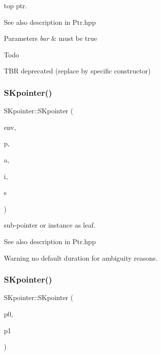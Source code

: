 top ptr. 

\begin{DoxySeeAlso}{See also}
description in Ptr.\+hpp 
\end{DoxySeeAlso}

\begin{DoxyParams}{Parameters}
{\em bar} & must be true \\
\hline
\end{DoxyParams}
\begin{DoxyRefDesc}{Todo}
\item[\mbox{\hyperlink{todo__todo000033}{Todo}}]T\+BR deprecated (replace by specific constructor) \end{DoxyRefDesc}
\mbox{\label{group__table_gac3044b001a0035c0ea79ffac0a57d1d9}} 
\subsubsection{\texorpdfstring{SKpointer()}{SKpointer()}\hspace{0.1cm}{\footnotesize\ttfamily [2/4]}}
{\footnotesize\ttfamily S\+Kpointer\+::\+S\+Kpointer (\begin{DoxyParamCaption}\item[{\mbox{\hyperlink{classEnvironment}{Environment}} $\ast$}]{env,  }\item[{const \mbox{\hyperlink{classSKpointer}{S\+Kpointer}} \&}]{p,  }\item[{size\+\_\+t}]{a,  }\item[{size\+\_\+t}]{i,  }\item[{state\+\_\+t}]{s }\end{DoxyParamCaption})}



sub-\/pointer or instance as leaf. 

\begin{DoxySeeAlso}{See also}
description in Ptr.\+hpp 
\end{DoxySeeAlso}
\begin{DoxyWarning}{Warning}
no default duration for ambiguity reasons. 
\end{DoxyWarning}
\mbox{\label{group__table_gaf762b88808d2e8188b74e28256d3ed09}} 
\subsubsection{\texorpdfstring{SKpointer()}{SKpointer()}\hspace{0.1cm}{\footnotesize\ttfamily [3/4]}}
{\footnotesize\ttfamily S\+Kpointer\+::\+S\+Kpointer (\begin{DoxyParamCaption}\item[{const \mbox{\hyperlink{classSKpointer}{S\+Kpointer}} \&}]{p0,  }\item[{const \mbox{\hyperlink{classSKpointer}{S\+Kpointer}} \&}]{p1 }\end{DoxyParamCaption})}



